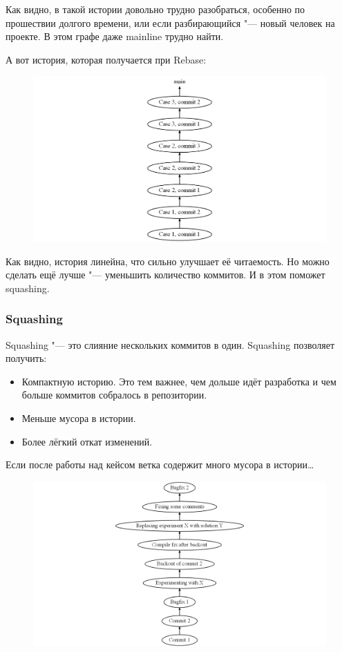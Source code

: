 \documentclass[10pt, a5paper]{article}
\begin{document}
Как видно, в такой истории довольно трудно разобраться, особенно по прошествии долгого времени, или если разбирающийся "--- новый человек на проекте. В этом графе даже mainline трудно найти.

А вот история, которая получается при Rebase:
\begin{figure}[h!]
  \centering
  \includegraphics[scale=0.2]{02_2014_main-ordered.png}
\end{figure}

Как видно, история линейна, что сильно улучшает её читаемость. Но можно сделать ещё лучше "--- уменьшить количество коммитов. И в этом поможет squashing.

\subsubsection*{Squashing}

Squashing "--- это слияние нескольких коммитов в один. Squashing позволяет получить:

\begin{itemize}
  \item Компактную историю. Это тем важнее, чем дольше идёт разработка и чем больше коммитов собралось в репозитории.
  \item Меньше мусора в истории.
  \item Более лёгкий откат изменений.
\end{itemize}

Если после работы над кейсом ветка содержит много мусора в истории\ldots{}
\begin{figure}[h!]
  \centering
  \includegraphics[scale=0.2]{02_2014_history-with-garbage.png}
\end{figure}
\end{document}
